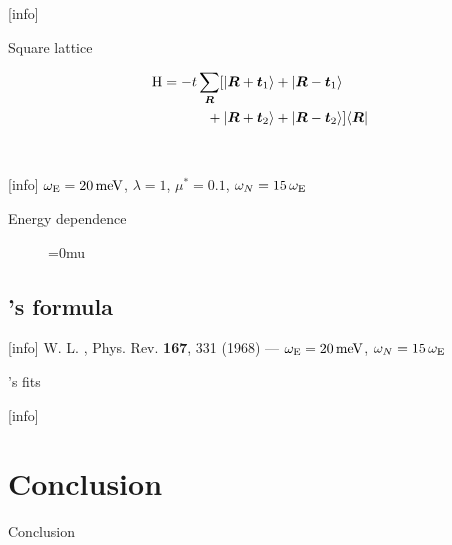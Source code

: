 \documentclass[10pt]{beamer}
\begin{document}
    [info]{}

    \begin{frame}[label=lattice]{Square lattice}
        \begin{figure}
            \small
            \begin{minipage}[c][4cm][c]{12cm/3}
                
            \end{minipage}%
            \begin{minipage}[c][4cm][c]{16cm/3}
                \begin{align*}
                    \mathrm H = -t \sum_{\boldsymbol R}
                         [  |\boldsymbol R + \boldsymbol t_1\rangle
                         &+ |\boldsymbol R - \boldsymbol t_1\rangle \\{}
                          + |\boldsymbol R + \boldsymbol t_2\rangle
                         &+ |\boldsymbol R - \boldsymbol t_2\rangle ]
                    \langle\boldsymbol R|
                \end{align*}
            \end{minipage}\\
            
        \end{figure}
    \end{frame}

    [info]{%
        $\omega \sb{\text{E}} = 20 \, \mathrm{meV}$, $\lambda = 1$, $\mu^* = 0.1$,
        $\omega_N = 15 \, \omega \sb{\text{E}}$}

    \begin{frame}[label=energy]{Energy dependence}
        \begin{figure}
            \small
            \centering
            \medmuskip=0mu
            
            
            
        \end{figure}
    \end{frame}

    \subsection{'s formula}

    [info]{%
        W. L. , Phys. Rev. \textbf{167}, 331 (1968) ---
        $\omega \sb{\text{E}} = 20 \, \mathrm{meV}$, $\omega_N = 15 \, \omega \sb{\text{E}}$}

    \begin{frame}[label=McMillan]{'s fits}
        \begin{figure}
            \small
            \centering
        \end{figure}
    \end{frame}

    [info]{}

	\section{Conclusion}

	\begin{frame}{Conclusion}
	\end{frame}
\end{document}
